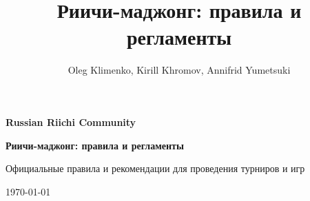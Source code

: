 \documentclass[16pt, a4paper]{article}
\author{Oleg Klimenko, Kirill Khromov, Annifrid Yumetsuki}
\title{Риичи-маджонг: правила и регламенты}
\begin{document}
	\setlength\parindent{15pt}
	\pagestyle{empty}
	\begin{center}
		\LARGE
		{\bfseries Russian Riichi Community\par}
		\vspace{4cm}
		{\huge\bfseries Риичи-маджонг: правила и регламенты\par}
		\vspace{3cm}
		\par
		
		\normalsize
		Официальные правила и рекомендации для проведения турниров и игр\par
		\vfill
		\today
	\end{center}
	\newpage
	
	\tableofcontents
	\newpage
	
	\pagestyle{plain}
	
	
	
	\newpage
	
	
\end{document}
